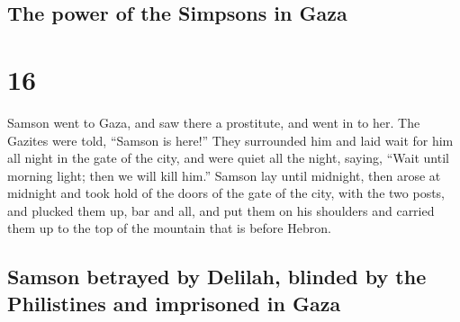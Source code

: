 \hypertarget{the-power-of-the-simpsons-in-gaza}{%
\subsection{The power of the Simpsons in
Gaza}\label{the-power-of-the-simpsons-in-gaza}}

\hypertarget{section-15}{%
\section{16}\label{section-15}}

 Samson went to Gaza, and saw there a prostitute, and went
in to her.  The Gazites were told, ``Samson is here!''
They surrounded him and laid wait for him all night in the gate of the
city, and were quiet all the night, saying, ``Wait until morning light;
then we will kill him.''  Samson lay until midnight, then
arose at midnight and took hold of the doors of the gate of the city,
with the two posts, and plucked them up, bar and all, and put them on
his shoulders and carried them up to the top of the mountain that is
before Hebron.

\hypertarget{samson-betrayed-by-delilah-blinded-by-the-philistines-and-imprisoned-in-gaza}{%
\subsection{Samson betrayed by Delilah, blinded by the Philistines and
imprisoned in
Gaza}\label{samson-betrayed-by-delilah-blinded-by-the-philistines-and-imprisoned-in-gaza}}

